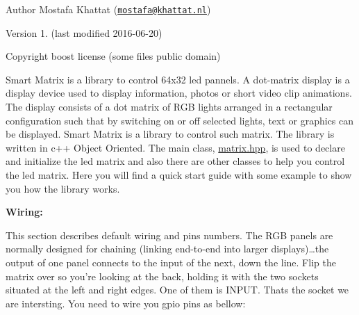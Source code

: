  \begin{DoxyAuthor}{Author}
Mostafa Khattat (\href{mailto:mostafa@khattat.nl}{\tt mostafa@khattat.\+nl}) 
\end{DoxyAuthor}
\begin{DoxyVersion}{Version}
1. (last modified 2016-\/06-\/20) 
\end{DoxyVersion}
\begin{DoxyCopyright}{Copyright}
boost license (some files public domain)
\end{DoxyCopyright}
Smart Matrix is a library to control 64x32 led pannels. A dot-\/matrix display is a display device used to display information, photos or short video clip animations. The display consists of a dot matrix of R\+GB lights arranged in a rectangular configuration such that by switching on or off selected lights, text or graphics can be displayed. Smart Matrix is a library to control such matrix. The library is written in c++ Object Oriented. The main class, \hyperlink{matrix_8hpp}{matrix.\+hpp}, is used to declare and initialize the led matrix and also there are other classes to help you control the led matrix. Here you will find a quick start guide with some example to show you how the library works.

{\bfseries Wiring\+:} 

This section describes default wiring and pins numbers. The R\+GB panels are normally designed for chaining (linking end-\/to-\/end into larger displays)…the output of one panel connects to the input of the next, down the line. Flip the matrix over so you’re looking at the back, holding it with the two sockets situated at the left and right edges. One of them is I\+N\+P\+UT. That\textquotesingle{}s the socket we are intersting.  You need to wire you gpio pins as bellow\+: 

